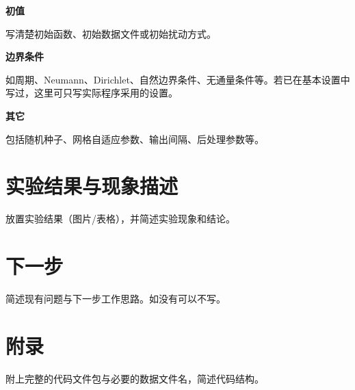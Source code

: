 \documentclass[UTF8,a4paper,11pt]{ctexart}
\newcommand{\hint}[1]{{\small\color{midgray}#1}\par}
\begin{document}
\noindent\textbf{初值}\par
\hint{写清楚初始函数、初始数据文件或初始扰动方式。}
\vspace{1.0em}

\noindent\textbf{边界条件}\par
\hint{如周期、Neumann、Dirichlet、自然边界条件、无通量条件等。若已在基本设置中写过，这里可只写实际程序采用的设置。}
\vspace{1.0em}

\noindent\textbf{其它}\par
\hint{包括随机种子、网格自适应参数、输出间隔、后处理参数等。}
\vspace{1.0em}

\section{实验结果与现象描述}
\hint{放置实验结果（图片/表格），并简述实验现象和结论。}

\vspace{2cm}


\section{下一步}
\hint{简述现有问题与下一步工作思路。如没有可以不写。}

\vspace{2cm}

\section{附录}
\hint{附上完整的代码文件包与必要的数据文件名，简述代码结构。}
\end{document}
